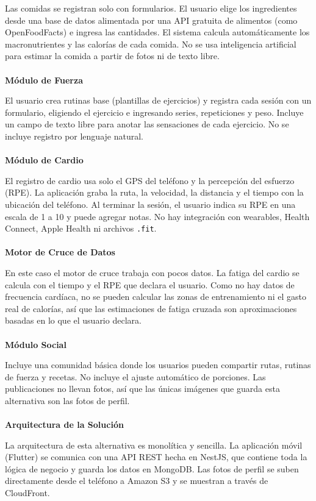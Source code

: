 Las comidas se registran solo con formularios. El usuario elige los ingredientes desde una base de datos alimentada por una API gratuita de alimentos (como OpenFoodFacts) e ingresa las cantidades. El sistema calcula automáticamente los macronutrientes y las calorías de cada comida. No se usa inteligencia artificial para estimar la comida a partir de fotos ni de texto libre.
\\\\
\textbf{Módulo de Fuerza}

El usuario crea rutinas base (plantillas de ejercicios) y registra cada sesión con un formulario, eligiendo el ejercicio e ingresando series, repeticiones y peso. Incluye un campo de texto libre para anotar las sensaciones de cada ejercicio. No se incluye registro por lenguaje natural.
\\\\
\textbf{Módulo de Cardio}

El registro de cardio usa solo el GPS del teléfono y la percepción del esfuerzo (RPE). La aplicación graba la ruta, la velocidad, la distancia y el tiempo con la ubicación del teléfono. Al terminar la sesión, el usuario indica su RPE en una escala de 1 a 10 y puede agregar notas. No hay integración con wearables, Health Connect, Apple Health ni archivos \texttt{.fit}.
\\\\
\textbf{Motor de Cruce de Datos}

En este caso el motor de cruce trabaja con pocos datos. La fatiga del cardio se calcula con el tiempo y el RPE que declara el usuario. Como no hay datos de frecuencia cardíaca, no se pueden calcular las zonas de entrenamiento ni el gasto real de calorías, así que las estimaciones de fatiga cruzada son aproximaciones basadas en lo que el usuario declara.
\\\\
\textbf{Módulo Social}

Incluye una comunidad básica donde los usuarios pueden compartir rutas, rutinas de fuerza y recetas. No incluye el ajuste automático de porciones. Las publicaciones no llevan fotos, así que las únicas imágenes que guarda esta alternativa son las fotos de perfil.
\\\\
\textbf{Arquitectura de la Solución}

La arquitectura de esta alternativa es monolítica y sencilla. La aplicación móvil (Flutter) se comunica con una API REST hecha en NestJS, que contiene toda la lógica de negocio y guarda los datos en MongoDB. Las fotos de perfil se suben directamente desde el teléfono a Amazon S3 y se muestran a través de CloudFront.

